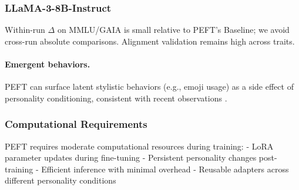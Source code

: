 \subsubsection{LLaMA-3-8B-Instruct}
Within-run \(\Delta\) on MMLU/GAIA is small relative to PEFT's Baseline; we avoid cross-run absolute comparisons. Alignment validation remains high across traits.

\paragraph{Emergent behaviors.} PEFT can surface latent stylistic behaviors (e.g., emoji usage) as a side effect of personality conditioning, consistent with recent observations \citep{jain-2025-peft-emoji}.

\subsubsection{Computational Requirements}

PEFT requires moderate computational resources during training:
- LoRA parameter updates during fine-tuning
- Persistent personality changes post-training
- Efficient inference with minimal overhead
- Reusable adapters across different personality conditions
